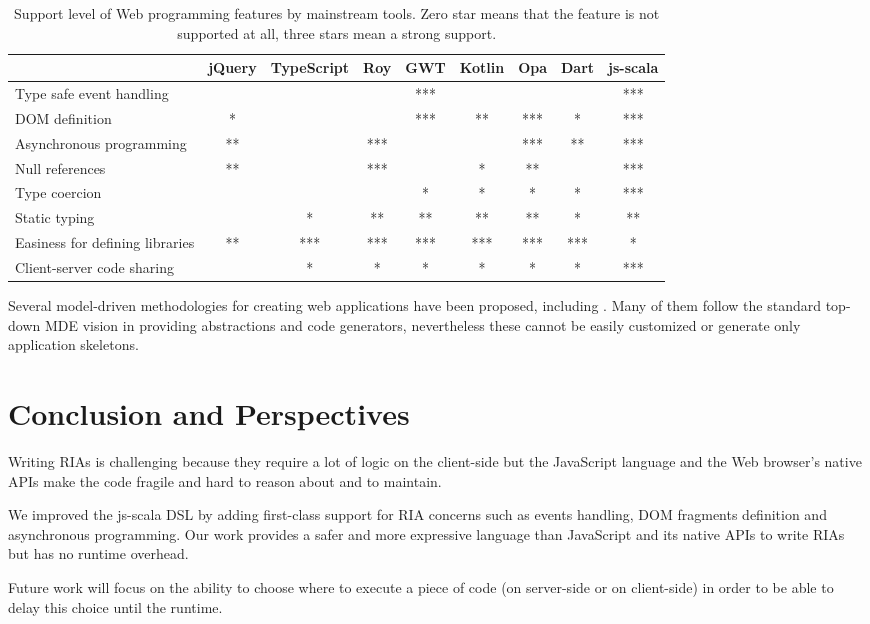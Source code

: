 \documentclass[american,english,runningheads]{llncs}
\begin{document}
\begin{table}
\centering
\begin{tabular}{| l | c | c | c | c | c | c | c | c |}
\hline
& jQuery & TypeScript & Roy & GWT & Kotlin & Opa & Dart & js-scala \\
\hline
Type safe event handling & & & & *** & & & & *** \\
\hline
DOM definition & * & & & *** & ** & *** & * & *** \\
\hline
Asynchronous programming & ** & & *** & & & *** & ** & *** \\
\hline
Null references & ** & & *** & & * & ** & & *** \\
\hline
Type coercion & & & & * & * & * & * & *** \\
\hline
Static typing & & * & ** & ** & ** & ** & * & ** \\
\hline
Easiness for defining libraries & ** & *** & *** & *** & *** & *** & *** & * \\
\hline
Client-server code sharing & & * & * & * & * & *  & * & *** \\
\hline
\end{tabular}
\caption{Support level of Web programming features by mainstream tools. Zero star means that the feature is not supported
at all, three stars mean a strong support.}
\label{comparison}
\end{table}

Several model-driven methodologies for creating web applications have been proposed, including
\cite{schwabe1996systematic,lima2003modeling,ceri2000web,koch2001authoring,pastor2003oows,valverde2007mda,vdovjak2003engineering,kraus2007model,nunes2006rapid,brambilla2008designing,valderas2007transformational,van2006hera,Groenewegen08_WebDSL}.
Many of them follow the standard top-down MDE vision in providing abstractions and code generators, nevertheless
these cannot be easily customized or generate only application skeletons.

\section{Conclusion and Perspectives}
\label{discussion}

Writing RIAs is challenging because they require a lot of logic on the client-side but the JavaScript language and
the Web browser’s native APIs make the code fragile and hard to reason about and to maintain.

We improved the js-scala DSL by adding first-class support for RIA concerns such as events handling,
DOM fragments definition and asynchronous programming. Our work provides a safer and more expressive language than
JavaScript and its native APIs to write RIAs but has no runtime overhead.

Future work will focus on the ability to choose where to execute a piece of code (on server-side or on client-side)
in order to be able to delay this choice until the runtime.



\end{document}
